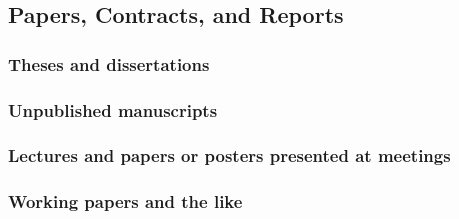 \documentclass[11pt,letterpaper,oneside]{article}
\begin{document}
\begin{citebib}
\item \cite{powell1998}
\item \cite{braun2016}
\end{citebib}

\setcounter{subsection}{7}
\subsection{Papers, Contracts, and Reports}
\setcounter{subsection}{14}

\setcounter{subsubsection}{214}
\subsubsection{Theses and dissertations}

\begin{citebib}
\item \cite[59]{vedrashko2006}
\item \cite[v]{subacus2015}
\item \cite{choi2008}
\end{citebib}

\subsubsection{Unpublished manuscripts}
\label{14.216}

\begin{citebib}
\item \cite{balderdash2017}
\end{citebib}

\subsubsection{Lectures and papers or posters presented at meetings}
\label{14.217}

\begin{bibonly}
\nocite{hong2015}
\nocite{teplin2005}
\end{bibonly}

\subsubsection{Working papers and the like}
\label{14.218}

\begin{citebib}
\item \cite{lucki1980}
\item \cite{bronfenbrenner2011}
\item \cite{alarcon1771}
\end{citebib}
\end{document}
